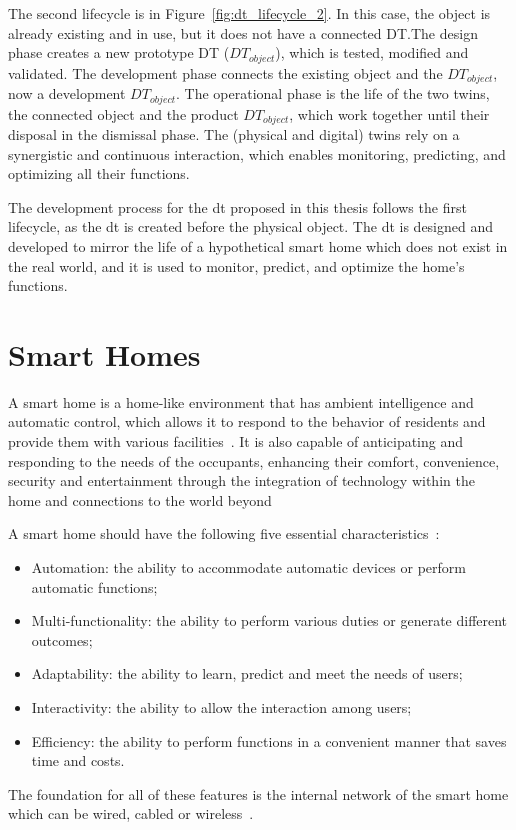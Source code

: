 The second lifecycle is in Figure~\ref{fig:dt_lifecycle_2}. In this case, the object is already existing and in use, but it does not have a connected DT.\@ The design phase creates a new prototype DT (\(DT_{object}\)), which is tested, modified and validated. The development phase connects the existing object and the \(DT_{object}\), now a development \(DT_{object}\). The operational phase is the life of the two twins, the connected object and the product \(DT_{object}\), which work together until their disposal in the dismissal phase. The (physical and digital) twins rely on a synergistic and continuous interaction, which enables monitoring, predicting, and optimizing all their functions.

The development process for the \acrshort{dt} proposed in this thesis follows the first lifecycle, as the \acrshort{dt} is created before the physical object. The \acrshort{dt} is designed and developed to mirror the life of a hypothetical smart home which does not exist in the real world, and it is used to monitor, predict, and optimize the home's functions.

\section{Smart Homes}

A smart home is a home-like environment that has ambient intelligence and automatic control, which allows it to respond to the behavior of residents and provide them with various facilities~\parencite{desilvaStateArtSmart2012}. It is also capable of anticipating and responding to the needs of the occupants, enhancing their comfort, convenience, security and entertainment through the integration of technology within the home and connections to the world beyond~\parencite{aldrichSmartHomesPresent2003}

A smart home should have the following five essential characteristics~\parencite{leSmartHomesOlder2012}:
\begin{itemize}
    \item Automation: the ability to accommodate automatic devices or perform automatic functions;
    \item Multi-functionality: the ability to perform various duties or generate different outcomes;
    \item Adaptability: the ability to learn, predict and meet the needs of users;
    \item Interactivity: the ability to allow the interaction among users;
    \item Efficiency: the ability to perform functions in a convenient manner that saves time and costs.
\end{itemize}
The foundation for all of these features is the internal network of the smart home which can be wired, cabled or wireless~\parencite{jiangSmartHomeResearch2004}.

